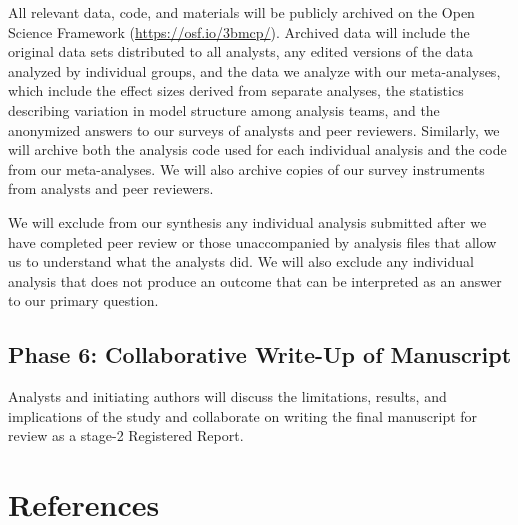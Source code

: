 \documentclass[
  12pt,
]{article}
\begin{document}
All relevant data, code, and materials will be publicly archived on the Open Science Framework (\url{https://osf.io/3bmcp/}).
Archived data will include the original data sets distributed to all analysts, any edited versions of the data analyzed by individual groups, and the data we analyze with our meta-analyses, which include the effect sizes derived from separate analyses, the statistics describing variation in model structure among analysis teams, and the anonymized answers to our surveys of analysts and peer reviewers.
Similarly, we will archive both the analysis code used for each individual analysis and the code from our meta-analyses.
We will also archive copies of our survey instruments from analysts and peer reviewers.

We will exclude from our synthesis any individual analysis submitted after we have completed peer review or those unaccompanied by analysis files that allow us to understand what the analysts did.
We will also exclude any individual analysis that does not produce an outcome that can be interpreted as an answer to our primary question.

\hypertarget{phase-6-collaborative-write-up-of-manuscript}{%
\subsection{Phase 6: Collaborative Write-Up of Manuscript}\label{phase-6-collaborative-write-up-of-manuscript}}

Analysts and initiating authors will discuss the limitations, results, and implications of the study and collaborate on writing the final manuscript for review as a stage-2 Registered Report.

\newpage

\hypertarget{references}{%
\section{References}\label{references}}

\begingroup
\setlength{\parindent}{-0.5in}
\setlength{\leftskip}{0.5in}
\end{document}
